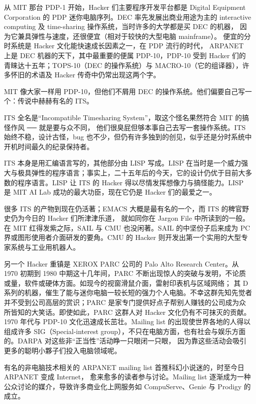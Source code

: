 从 MIT 那台 PDP-1 开始，Hacker 们主要程序开发平台都是 Digital Equipment Corporation 的 PDP 迷你电脑序列。DEC 率先发展出商业用途为主的 interactive computing 及 time-sharing 操作系统，当时许多的大学都是买 DEC 的机器， 因为它兼具弹性与速度，还很便宜（相对于较快的大型电脑 mainframe）。 便宜的分时系统是 Hacker 文化能快速成长因素之一，在 PDP 流行的时代， ARPANET 上是 DEC 机器的天下，其中最重要的便属 PDP-10，PDP-10 受到 Hacker 们的青睐达十五年；TOPS-10（DEC 的操作系统）与 MACRO-10（它的组译器），许多怀旧的术语及 Hacker 传奇中仍常出现这两个字。

MIT 像大家一样用 PDP-10，但他们不屑用 DEC 的操作系统。他们偏要自己写一个：传说中赫赫有名的 ITS。

ITS 全名是“Incompatible Timesharing System”，取这个怪名果然符合 MIT 的搞怪作风 ── 就是要与众不同， 他们很臭屁但够本事自己去写一套操作系统。ITS 始终不稳，设计古怪，bug 也不少，但仍有许多独到的创见，似乎还是分时系统中开机时间最久的纪录保持者。

ITS 本身是用汇编语言写的，其他部分由 LISP 写成。LISP 在当时是一个威力强大与极具弹性的程序语言；事实上，二十五年后的今天，它的设计仍优于目前大多数的程序语言。LISP 让 ITS 的 Hacker 得以尽情发挥想像力与搞怪能力。LISP 是 MIT AI Lab 成功的最大功臣，现在它仍是 Hacker 们的最爱之一。

很多 ITS 的产物到现在仍活著；EMACS 大概是最有名的一个，而 ITS 的稗官野史仍为今日的 Hacker 们所津津乐道， 就如同你在 Jargon File 中所读到的一般。在 MIT 红得发紫之际，SAIL 与 CMU 也没闲著。SAIL 的中坚份子后来成为 PC 界或图形使用者介面研发的要角。CMU 的 Hacker 则开发出第一个实用的大型专家系统与工业用机器人。

另一个 Hacker 重镇是 XEROX PARC 公司的 Palo Alto Research Center。从 1970 初期到 1980 中期这十几年间，PARC 不断出现惊人的突破与发明，不论质或量，软件或硬体方面。如现今的视窗滑鼠介面，雷射印表机与区域网络； 其 D 系列的机器，催生了能与迷你电脑一较长短的强力个人电脑。不幸这群先知先觉者并不受到公司高层的赏识；PARC 是家专门提供好点子帮别人赚钱的公司成为众所皆知的大笑话。即使如此，PARC 这群人对 Hacker 文化仍有不可抹灭的贡献。1970 年代与 PDP-10 文化迅速成长茁壮。Mailing list 的出现使世界各地的人得以组成许多 SIG（Special-interest group），不只在电脑方面，也有社会与娱乐方面的。DARPA 对这些非“正当性”活动睁一只眼闭一只眼， 因为靠这些活动会吸引更多的聪明小夥子们投入电脑领域呢。

有名的非电脑技术相关的 ARPANET mailing list 首推科幻小说迷的，时至今日 ARPANET 变成 Internet， 愈来愈多的读者参与讨论。Mailing list 逐渐成为一种公众讨论的媒介，导致许多商业化上网服务如 CompuServe、Genie 与 Prodigy 的成立。

